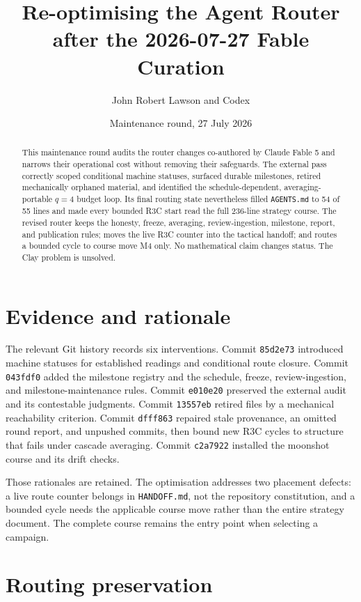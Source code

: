 \documentclass[11pt]{article}
\title{Re-optimising the Agent Router after the 2026-07-27 Fable Curation}
\author{John Robert Lawson and Codex}
\date{Maintenance round, 27 July 2026}
\theoremstyle{remark}
\begin{document}
\maketitle

\begin{abstract}
This maintenance round audits the router changes co-authored by Claude
Fable 5 and narrows their operational cost without removing their
safeguards.  The external pass correctly scoped conditional machine
statuses, surfaced durable milestones, retired mechanically orphaned
material, and identified the schedule-dependent, averaging-portable
\(q=4\) budget loop.  Its final routing state nevertheless filled
\texttt{AGENTS.md} to 54 of 55 lines and made every bounded R3C start
read the full 236-line strategy course.  The revised router keeps the
honesty, freeze, averaging, review-ingestion, milestone, report, and
publication rules; moves the live R3C counter into the tactical handoff;
and routes a bounded cycle to course move M4 only.  No mathematical
claim changes status.  The Clay problem is unsolved.
\end{abstract}

\section{Evidence and rationale}

The relevant Git history records six interventions.  Commit
\texttt{85d2e73} introduced machine statuses for established readings
and conditional route closure.  Commit \texttt{043fdf0} added the
milestone registry and the schedule, freeze, review-ingestion, and
milestone-maintenance rules.  Commit \texttt{e010e20} preserved the
external audit and its contestable judgments.  Commit \texttt{13557eb}
retired files by a mechanical reachability criterion.  Commit
\texttt{dfff863} repaired stale provenance, an omitted round report,
and unpushed commits, then bound new R3C cycles to structure that fails
under cascade averaging.  Commit \texttt{c2a7922} installed the
moonshot course and its drift checks.

Those rationales are retained.  The optimisation addresses two
placement defects: a live route counter belongs in
\texttt{HANDOFF.md}, not the repository constitution, and a bounded
cycle needs the applicable course move rather than the entire strategy
document.  The complete course remains the entry point when selecting
a campaign.

\section{Routing preservation}
\end{document}
